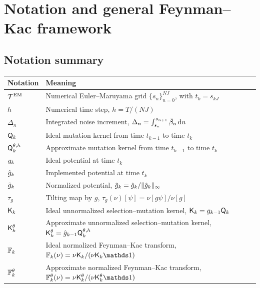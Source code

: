 \documentclass[11pt]{article}
\theoremstyle{plain}
\theoremstyle{definition}
\theoremstyle{remark}
\begin{document}
\section{Notation and general Feynman--Kac framework}
\label{app:fk_framework}

\subsection{Notation summary}

\begin{table}[ht]
    \centering
    \normalsize
    \renewcommand{\arraystretch}{1.1}
    \setlength{\tabcolsep}{4pt}

    \begin{tabularx}{\textwidth}{@{}l>{\raggedright\arraybackslash}X@{}}
    \toprule
    Notation & Meaning \\
    \midrule
    $\mathcal T^{\rm EM}$ & Numerical Euler--Maruyama grid $\{s_n\}_{n=0}^{NJ}$, with $t_k=s_{kJ}$ \\ 
    $h$ & Numerical time step, $h=T/(NJ)$ \\ 
    $\Delta_n$ & Integrated noise increment, $\Delta_n=\int_{s_n}^{s_{n+1}}\bar{\beta}_{u}\,\mathrm{d} u$ \\    
    $\mk{k}$ & Ideal mutation kernel from time $t_{k-1}$ to time $t_k$ \\
    $\mk{k}[\theta,h]$ & Approximate mutation kernel from time $t_{k-1}$ to time $t_k$ \\
    $\pot{k}$ & Ideal potential at time $t_k$ \\
    $\approxpot{k}$ & Implemented potential at time $t_k$ \\
    $\potnorm{k}$ & Normalized potential, $\potnorm{k}=\approxpot{k}/\|\approxpot{k}\|_\infty$ \\
    $\tau_g$ & Tilting map by $g$, $\tau_g(\nu)[\psi]=\nu[g\psi]/\nu[g]$ \\
    $\unpredictive{k}$ & Ideal unnormalized selection--mutation kernel, $\unpredictive{k}=\pot{k-1}\mk{k}$ \\
    $\unpredictive{k}[\theta]$ & Approximate unnormalized selection--mutation kernel, $\unpredictive{k}[\theta]=\approxpot{k-1}\mk{k}[\theta,h]$ \\
    $\filtertransform{k}$ & Ideal normalized Feynman--Kac transform, $\filtertransform{k}(\nu)=\nu\unpredictive{k}/(\nu\unpredictive{k}\un)$ \\
    $\filtertransform{k}[\theta]$ & Approximate normalized Feynman--Kac transform, $\filtertransform{k}[\theta](\nu)=\nu\unpredictive{k}[\theta]/(\nu\unpredictive{k}[\theta]\un)$ \\

\end{tabularx}
\end{table}
\end{document}
